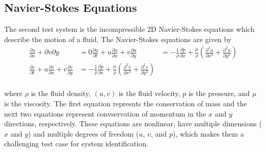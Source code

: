 \documentclass{article}
\begin{document}
\subsection{Navier-Stokes Equations}
The second test system is the incompressible 2D Navier-Stokes equations which describe the motion of a fluid. The Navier-Stokes equations are given by
\begin{align}
  \frac{\partial u}{\partial x} + \partial{v}{\partial y} &= 0
  \frac{\partial u }{\partial t} + u \frac{\partial u }{\partial x} + v \frac{\partial u }{\partial y} &= - \frac{1}{\rho} \frac{\partial p}{\partial x} + \frac{\mu}{\rho}\left( \frac{\partial^2 u}{\partial x^2} + \frac{\partial^2 u}{\partial y^2} \right) \\
\frac{\partial v }{\partial t} + u \frac{\partial v }{\partial x} + v \frac{\partial v }{\partial y} &= - \frac{1}{\rho} \frac{\partial p}{\partial v} + \frac{\mu}{\rho}\left( \frac{\partial^2 v}{\partial x^2} + \frac{\partial^2 v}{\partial y^2} \right) \\
\end{align}

where $\rho$ is the fluid density, $(u, v)$ is the fluid velocity, $p$ is the pressure, and $\mu$ is the viscosity. The first equation represnts the conservation of mass and the next two equations represent convservation of momentum in the $x$ and $y$ directions, respectively. These equations are nonlinear, have multiple dimensions ($x$ and $y$) and multiple degrees of freedom ($u$, $v$, and $p$), which makes them a challenging test case for system identification.
\end{document}
